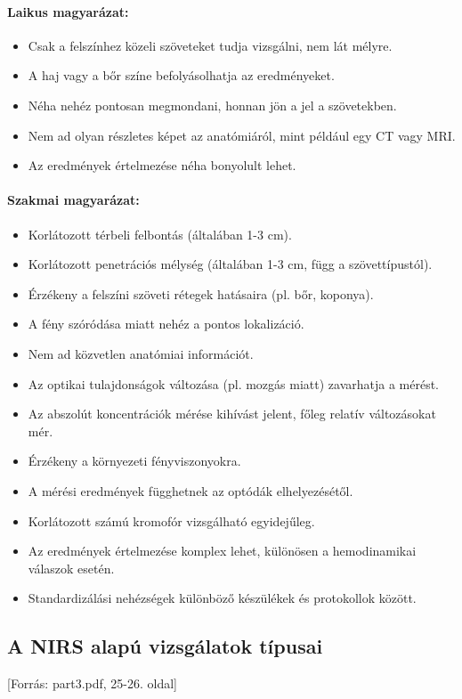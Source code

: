 \documentclass[a4paper,12pt]{article}
\begin{document}
\paragraph{Laikus magyarázat:} \begin{itemize} \item Csak a felszínhez közeli szöveteket tudja vizsgálni, nem lát mélyre. \item A haj vagy a bőr színe befolyásolhatja az eredményeket. \item Néha nehéz pontosan megmondani, honnan jön a jel a szövetekben. \item Nem ad olyan részletes képet az anatómiáról, mint például egy CT vagy MRI. \item Az eredmények értelmezése néha bonyolult lehet. \end{itemize}

\paragraph{Szakmai magyarázat:} \begin{itemize} \item Korlátozott térbeli felbontás (általában 1-3 cm). \item Korlátozott penetrációs mélység (általában 1-3 cm, függ a szövettípustól). \item Érzékeny a felszíni szöveti rétegek hatásaira (pl. bőr, koponya). \item A fény szóródása miatt nehéz a pontos lokalizáció. \item Nem ad közvetlen anatómiai információt. \item Az optikai tulajdonságok változása (pl. mozgás miatt) zavarhatja a mérést. \item Az abszolút koncentrációk mérése kihívást jelent, főleg relatív változásokat mér. \item Érzékeny a környezeti fényviszonyokra. \item A mérési eredmények függhetnek az optódák elhelyezésétől. \item Korlátozott számú kromofór vizsgálható egyidejűleg. \item Az eredmények értelmezése komplex lehet, különösen a hemodinamikai válaszok esetén. \item Standardizálási nehézségek különböző készülékek és protokollok között. \end{itemize}

\subsection{A NIRS alapú vizsgálatok típusai} [Forrás: part3.pdf, 25-26. oldal]
\end{document}
